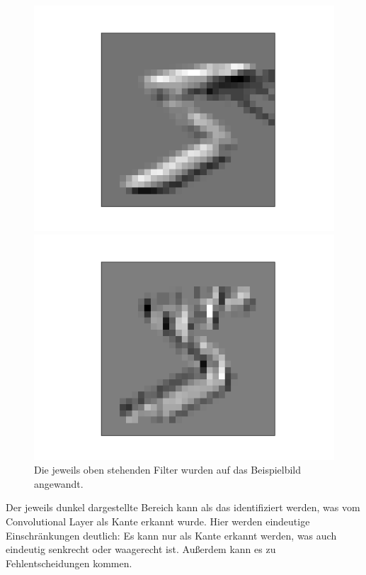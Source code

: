 \documentclass[11pt]{article}
\begin{document}
\begin{figure}[h]
\begin{minipage}{0.2\linewidth}
		\includegraphics[width=\linewidth]{../graphics/mnist_5/conv_only/mnist_5_lower_edges.png}
	\end{minipage}
	\hfill
	\begin{minipage}{0.2\linewidth}
		\centering
		\includegraphics[width=\linewidth]{../graphics/mnist_5/conv_only/mnist_5_right_edges.png}
	\end{minipage}
\caption{Die jeweils oben stehenden Filter wurden auf das Beispielbild angewandt.}
\label{Filter_output dargestellt}
\end{figure}
Der jeweils dunkel dargestellte Bereich kann als das identifiziert werden, was vom Convolutional Layer als Kante erkannt wurde. Hier werden eindeutige Einschränkungen deutlich: Es kann nur als Kante erkannt werden, was auch eindeutig senkrecht oder waagerecht ist. Außerdem kann es zu Fehlentscheidungen kommen.\\
\end{document}

